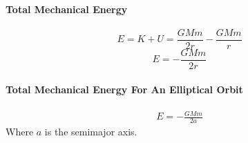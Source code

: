 \documentclass{article}
\begin{document}
        \paragraph{Total Mechanical Energy}
        \begin{equation}
            E = K + U = \frac{G M m}{2r} - \frac{G M m}{r} \nonumber
        \end{equation}
        \begin{equation}
            E = - \frac{G M m}{2 r}
        \end{equation}

        \paragraph{Total Mechanical Energy For An Elliptical Orbit}
        \begin{eqnarray}
            E = - \frac{G M m}{2 a}
        \end{eqnarray}
        Where $a$ is the semimajor axis.
\end{document}
